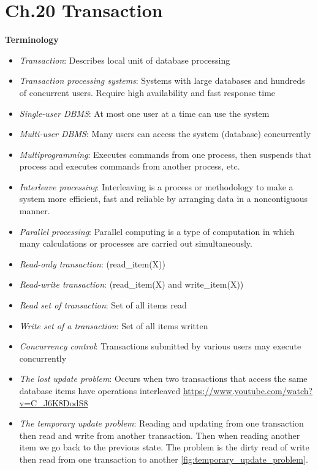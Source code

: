 \section{Ch.20 Transaction}
\textbf{Terminology}
\begin{itemize}
    \item \textit{Transaction}: Describes local unit of database processing
    \item \textit{Transaction processing systems}: Systems with large databases and hundreds of concurrent users. Require high availability and fast response time
    \item \textit{Single-user DBMS}: At most one user at a time can use the system
    \item \textit{Multi-user DBMS}: Many users can access the system (database) concurrently
    \item \textit{Multiprogramming}: Executes commands from one process, then suspends that process and executes commands from another process, etc.
    \item \textit{Interleave processing}: Interleaving is a process or methodology to make a system more efficient, fast and reliable by arranging data in a noncontiguous manner.
    \item \textit{Parallel processing}: Parallel computing is a type of computation in which many calculations or processes are carried out simultaneously.
    \item \textit{Read-only transaction}: (read\_item(X))
    \item \textit{Read-write transaction}: (read\_item(X) and write\_item(X))
    \item \textit{Read set of transaction}: Set of all items read
    \item \textit{Write set of a transaction}: Set of all items written
    \item \textit{Concurrency control}: Transactions submitted by various users may execute concurrently
    \item \textit{The lost update problem}: Occurs when two transactions that access the same database items have operations interleaved
    \url{https://www.youtube.com/watch?v=C_J6K8DodS8}
    \item \textit{The temporary update problem}: Reading and updating from one transaction then read and write from another transaction. Then when reading another item we go back to the previous state. The problem is the dirty read of write then read from one transaction to another \ref{fig:temporary_update_problem}. 

\end{itemize}
